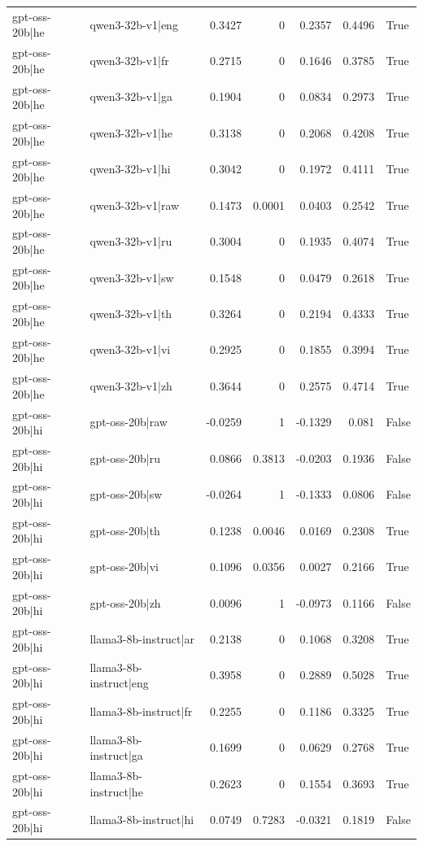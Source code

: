 \begin{table}
\begin{tabular}{l l r r r r l}
gpt-oss-20b|he & qwen3-32b-v1|eng & 0.3427 & 0 & 0.2357 & 0.4496 & True \\
gpt-oss-20b|he & qwen3-32b-v1|fr & 0.2715 & 0 & 0.1646 & 0.3785 & True \\
gpt-oss-20b|he & qwen3-32b-v1|ga & 0.1904 & 0 & 0.0834 & 0.2973 & True \\
gpt-oss-20b|he & qwen3-32b-v1|he & 0.3138 & 0 & 0.2068 & 0.4208 & True \\
gpt-oss-20b|he & qwen3-32b-v1|hi & 0.3042 & 0 & 0.1972 & 0.4111 & True \\
gpt-oss-20b|he & qwen3-32b-v1|raw & 0.1473 & 0.0001 & 0.0403 & 0.2542 & True \\
gpt-oss-20b|he & qwen3-32b-v1|ru & 0.3004 & 0 & 0.1935 & 0.4074 & True \\
gpt-oss-20b|he & qwen3-32b-v1|sw & 0.1548 & 0 & 0.0479 & 0.2618 & True \\
gpt-oss-20b|he & qwen3-32b-v1|th & 0.3264 & 0 & 0.2194 & 0.4333 & True \\
gpt-oss-20b|he & qwen3-32b-v1|vi & 0.2925 & 0 & 0.1855 & 0.3994 & True \\
gpt-oss-20b|he & qwen3-32b-v1|zh & 0.3644 & 0 & 0.2575 & 0.4714 & True \\
gpt-oss-20b|hi & gpt-oss-20b|raw & -0.0259 & 1 & -0.1329 & 0.081 & False \\
gpt-oss-20b|hi & gpt-oss-20b|ru & 0.0866 & 0.3813 & -0.0203 & 0.1936 & False \\
gpt-oss-20b|hi & gpt-oss-20b|sw & -0.0264 & 1 & -0.1333 & 0.0806 & False \\
gpt-oss-20b|hi & gpt-oss-20b|th & 0.1238 & 0.0046 & 0.0169 & 0.2308 & True \\
gpt-oss-20b|hi & gpt-oss-20b|vi & 0.1096 & 0.0356 & 0.0027 & 0.2166 & True \\
gpt-oss-20b|hi & gpt-oss-20b|zh & 0.0096 & 1 & -0.0973 & 0.1166 & False \\
gpt-oss-20b|hi & llama3-8b-instruct|ar & 0.2138 & 0 & 0.1068 & 0.3208 & True \\
gpt-oss-20b|hi & llama3-8b-instruct|eng & 0.3958 & 0 & 0.2889 & 0.5028 & True \\
gpt-oss-20b|hi & llama3-8b-instruct|fr & 0.2255 & 0 & 0.1186 & 0.3325 & True \\
gpt-oss-20b|hi & llama3-8b-instruct|ga & 0.1699 & 0 & 0.0629 & 0.2768 & True \\
gpt-oss-20b|hi & llama3-8b-instruct|he & 0.2623 & 0 & 0.1554 & 0.3693 & True \\
gpt-oss-20b|hi & llama3-8b-instruct|hi & 0.0749 & 0.7283 & -0.0321 & 0.1819 & False \\

\end{tabular}
\end{table}
